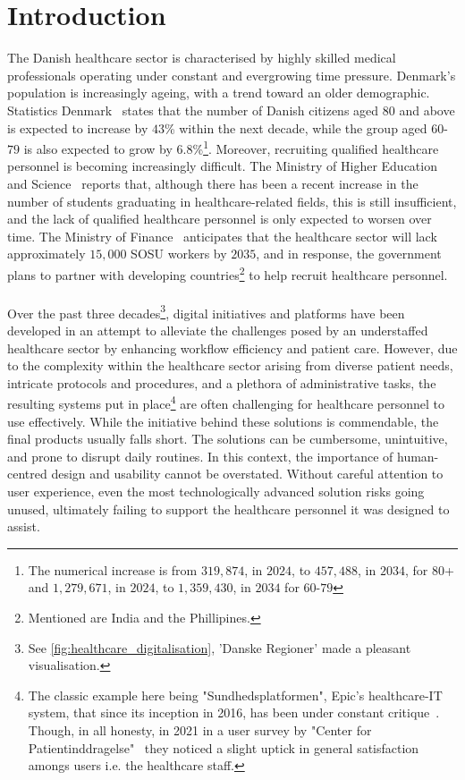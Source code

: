 \section{Introduction}
The Danish healthcare sector is characterised by highly skilled medical professionals operating under constant and evergrowing time pressure.
Denmark's population is increasingly ageing, with a trend toward an older demographic. Statistics Denmark~\cite{dst-older-pop} states that the number of Danish citizens aged $80$ and above is expected to increase by $43$\% within the next decade, while the group aged $60$-$79$ is also expected to grow by $6.8$\%\footnote{The numerical increase is from $319,874$, in $2024$, to $457,488$, in $2034$, for $80$+ and $1,279,671$, in $2024$, to $1,359,430$, in $2034$ for $60$-$79$}. Moreover, recruiting qualified healthcare personnel is becoming increasingly difficult. The Ministry of Higher Education and Science~\cite{MoHEaS-healthcare-rectruitment} reports that, although there has been a recent increase in the number of students graduating in healthcare-related fields, this is still insufficient, and the lack of qualified healthcare personnel is only expected to worsen over time. The Ministry of Finance~\cite{MoHEaS-healthcare-rectruitment} anticipates that the healthcare sector will lack approximately $15,000$ SOSU workers by $2035$, and in response, the government plans to partner with developing countries\footnote{Mentioned are India and the Phillipines.} to help recruit healthcare personnel.
\\
\\
Over the past three decades\footnote{See \autoref{fig:healthcare_digitalisation}, 'Danske Regioner' made a pleasant visualisation.}, digital initiatives and platforms have been developed in an attempt to alleviate the challenges posed by an understaffed healthcare sector by enhancing workflow efficiency and patient care. However, due to the complexity within the healthcare sector arising from diverse patient needs, intricate protocols and procedures, and a plethora of administrative tasks, the resulting systems put in place\footnote{The classic example here being "Sundhedsplatformen", Epic's healthcare-IT system, that since its inception in 2016, has been under constant critique~\cite{DR-healthcare-platform, Altinget-healthcare-platform, TV2-healthcare-platform}. Though, in all honesty, in 2021 in a user survey by "Center for Patientinddragelse"~\cite{SP-user-survey} they noticed a slight uptick in general satisfaction amongs users i.e. the healthcare staff.} are often challenging for healthcare personnel to use effectively. While the initiative behind these solutions is commendable, the final products usually falls short. The solutions can be cumbersome, unintuitive, and prone to disrupt daily routines. In this context, the importance of human-centred design and usability cannot be overstated. Without careful attention to user experience, even the most technologically advanced solution risks going unused, ultimately failing to support the healthcare personnel it was designed to assist.
